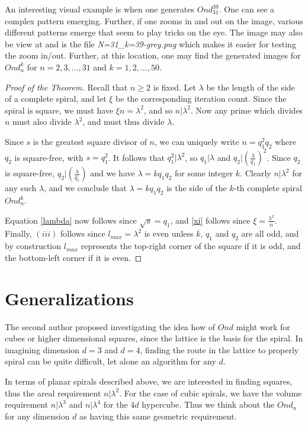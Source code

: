 \documentclass[11pt,reqno]{amsart}
\theoremstyle{mydef}
\begin{document}
An interesting visual example is when one generates  $Ond^{39}_{31}$. One can
see a complex pattern emerging.  Further, if one zooms
in and out on the image, various different patterns emerge that seem
to play tricks on the eye.  The image may also be view at
\cite{GraySquare} and is the file \textit{N=31\_k=39-grey.png} which
makes it easier for testing the zoom in/out.  Further, at this
location, one may find the generated images for $Ond^k_n$ for $n=2, 3,
\ldots, 31$ and $k=1,2, \ldots, 50$.

\begin{proof}[Proof of the Theorem]
  Recall that $n\ge 2$ is fixed.  Let $\lambda$ be the length of the
  side of a complete spiral, and let $\xi$ be the corresponding
  iteration count.  Since the spiral is square, we must have $\xi n =
  \lambda^2$, and so $n \vert \lambda^2$.  Now any prime which divides
  $n$ must also divide $\lambda^2$, and must thus divide $\lambda$.

  Since $s$ is the greatest square divisor of $n$, we can uniquely
  write $n = q^2_1 q_2$ where $q_2$ is square-free, with $s = q_1^2$.
  It follows that $q_1^2\vert\lambda^2$, so $q_1|\lambda$ and $q_2 \vert
  (\frac{\lambda}{q_1})^2$.  Since $q_2$ is square-free, $q_2\vert (\frac{\lambda}{q_1})$
  and we have $\lambda = k q_1 q_2$ for some integer $k$.  Clearly
  $n\vert\lambda^2$ for any such $\lambda$, and we conclude that $\lambda
  = k q_1 q_2$ is the side of the $k$-th complete spiral $Ond^k_n$.

  Equation \eqref{lambda} now follows since $\sqrt{s} = q_1$, and
  \eqref{xi} follows since $\xi = \frac{\lambda^2}{n}$.  Finally, $(iii)$
  follows since $l_{max} = \lambda^2$ is even unless $k$, $q_1$ and
  $q_2$ are all odd, and by construction $l_{max}$ represents the
  top-right corner of the square if it is odd, and the bottom-left
  corner if it is even.
\end{proof}


\section{Generalizations}

The second author proposed investigating the idea how of $Ond$ might
work for cubes or higher dimensional squares, since the lattice is the
basis for the spiral. In imagining dimension $d = 3$ and $d=4$, finding
the route in the lattice to properly spiral can be quite difficult, let alone an algorithm 
for any $d$. 

In terms of planar spirals described above, we are interested
in finding squares, thus the areal requirement $n \vert \lambda^2$. For the case
of cubic spirals, we have the volume requirement $n \vert \lambda^3$ and $n 
\vert \lambda^4$ for the $4d$ hypercube. Thus we think about the $Ond_n$ for any 
dimension $d$ as having this same geometric requirement.
\end{document}
